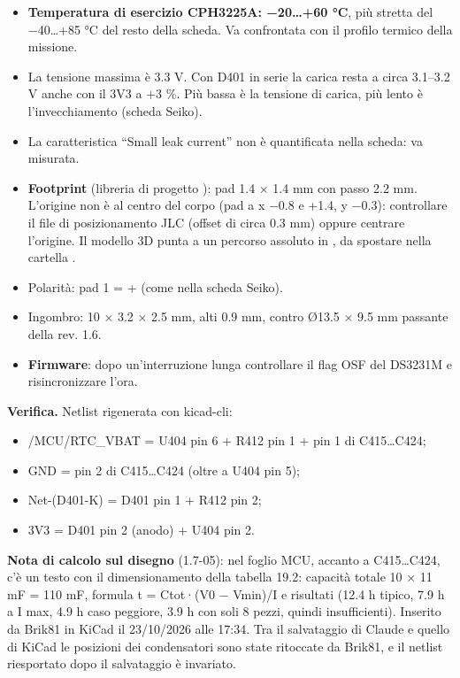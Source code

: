 \begin{itemize}
\item \textbf{Temperatura di esercizio CPH3225A: −20…+60 °C}, più stretta del −40…+85 °C del resto della scheda. Va confrontata con il profilo termico della missione.
\item La tensione massima è 3.3 V. Con D401 in serie la carica resta a circa 3.1–3.2 V anche con il 3V3 a +3 \%. Più bassa è la tensione di carica, più lento è l'invecchiamento (scheda Seiko).
\item La caratteristica \textquotedblleft{}Small leak current\textquotedblright{} non è quantificata nella scheda: va misurata.
\item \textbf{Footprint}  (libreria di progetto ): pad 1.4 × 1.4 mm con passo 2.2 mm. L'origine non è al centro del corpo (pad a x −0.8 e +1.4, y −0.3): controllare il file di posizionamento JLC (offset di circa 0.3 mm) oppure centrare l'origine. Il modello 3D punta a un percorso assoluto in , da spostare nella cartella .
\item Polarità: pad 1 = + (come nella scheda Seiko).
\item Ingombro: 10 × 3.2 × 2.5 mm, alti 0.9 mm, contro Ø13.5 × 9.5 mm passante della rev. 1.6.
\item \textbf{Firmware}: dopo un'interruzione lunga controllare il flag OSF del DS3231M e risincronizzare l'ora.
\end{itemize}

\textbf{Verifica.} Netlist rigenerata con kicad-cli:

\begin{itemize}
\item /\allowbreak{}MCU/\allowbreak{}RTC\_\allowbreak{}VBAT = U404 pin 6 + R412 pin 1 + pin 1 di C415…C424;
\item GND = pin 2 di C415…C424 (oltre a U404 pin 5);
\item Net-(D401-K) = D401 pin 1 + R412 pin 2;
\item 3V3 = D401 pin 2 (anodo) + U404 pin 2.
\end{itemize}

\textbf{Nota di calcolo sul disegno} (1.7-05): nel foglio MCU, accanto a C415…C424, c'è un testo con il dimensionamento della tabella 19.2: capacità totale 10 × 11 mF = 110 mF, formula t = Ctot·(V0 − Vmin)/\allowbreak{}I e risultati (12.4 h tipico, 7.9 h a I max, 4.9 h caso peggiore, 3.9 h con soli 8 pezzi, quindi insufficienti). Inserito da Brik81 in KiCad il 23/\allowbreak{}10/\allowbreak{}2026 alle 17:34. Tra il salvataggio di Claude e quello di KiCad le posizioni dei condensatori sono state ritoccate da Brik81, e il netlist riesportato dopo il salvataggio è invariato.

